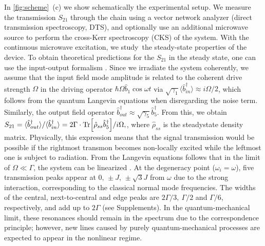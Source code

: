 \documentclass[%
 aps, prl,
 amsmath,amssymb,
 reprint,%
superscriptaddress
]{revtex4-2}
\begin{document}
In \autoref{fig:scheme}~(c) we show schematically the experimental setup. We measure the transmission $S_{21}$ through the chain using a vector network analyzer (direct transmission spectroscopy, DTS), and optionally use an additional microwave source to perform the cross-Kerr spectroscopy (CKS) of the system. With the continuous microwave excitation, we study the steady-state properties of the device. To obtain theoretical predictions for the $S_{21}$ in the steady state, one can use the input-output formalism \cite{yurke1984quantum,gardiner1985input}. Since we irradiate the system coherently, we assume that the input field mode amplitude is related to the coherent drive strength $\Omega$ in the driving operator $\hbar \Omega \hat b_1 \cos \omega t$ via $\sqrt{\gamma_1} \langle  \hat b_{in}^\dag \rangle \approx i \Omega/2$, which follows from the quantum Langevin equations when disregarding the noise term. Similarly, the output field operator $\hat b_{out}^\dag \approx \sqrt{\gamma_5} \hat b_5^\dag$. From this, we obtain $
	S_{21} = \langle \hat b_{out}^\dag\rangle / \langle \hat b_{in}^\dag \rangle = 2\Gamma\cdot \Tr[\hat \rho_{ss} \hat b_5^\dag]/{i\Omega} ,
$,
where $\hat \rho_{ss}$ is the steadystate density matrix. Physically, this expression means that the signal transmission would be possible if the rightmost transmon becomes non-locally excited while the leftmost one is subject to radiation. From the Langevin equations follows that in the limit of $\Omega \ll \Gamma$, the system can be linearized \cite{astafiev2010resonance}. At the degeneracy point ($\omega_i = \omega$), five transmission peaks appear at $0,\, \pm J,\, \pm \sqrt{3} J$ from $\omega$ due to the strong interaction, corresponding to the classical normal mode frequencies. The widths of the central, next-to-central and edge peaks are $2\Gamma/3,\ \Gamma/2$ and $\Gamma/6$, respectively, and add up to $2\Gamma$ (see Supplements).  In the quantum-mechanical limit, these resonances should remain in the spectrum due to the correspondence principle; however, new lines caused by purely quantum-mechanical processes are expected to appear in the nonlinear regime.
\end{document}
